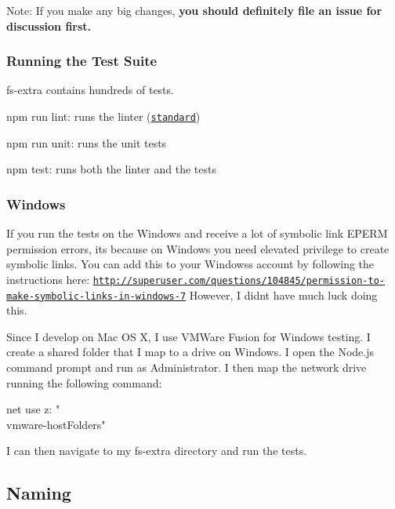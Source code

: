 Note\+: If you make any big changes, {\bfseries you should definitely file an issue for discussion first.}

\subsubsection*{Running the Test Suite}

fs-\/extra contains hundreds of tests.


\begin{DoxyItemize}
\item {\ttfamily npm run lint}\+: runs the linter (\href{http://standardjs.com/}{\tt standard})
\item {\ttfamily npm run unit}\+: runs the unit tests
\item {\ttfamily npm test}\+: runs both the linter and the tests
\end{DoxyItemize}

\subsubsection*{Windows}

If you run the tests on the Windows and receive a lot of symbolic link {\ttfamily E\+P\+E\+RM} permission errors, it\textquotesingle{}s because on Windows you need elevated privilege to create symbolic links. You can add this to your Windows\textquotesingle{}s account by following the instructions here\+: \href{http://superuser.com/questions/104845/permission-to-make-symbolic-links-in-windows-7}{\tt http\+://superuser.\+com/questions/104845/permission-\/to-\/make-\/symbolic-\/links-\/in-\/windows-\/7} However, I didn\textquotesingle{}t have much luck doing this.

Since I develop on Mac OS X, I use V\+M\+Ware Fusion for Windows testing. I create a shared folder that I map to a drive on Windows. I open the {\ttfamily Node.\+js command prompt} and run as {\ttfamily Administrator}. I then map the network drive running the following command\+: \begin{DoxyVerb}net use z: "\\vmware-host\Shared Folders"
\end{DoxyVerb}


I can then navigate to my {\ttfamily fs-\/extra} directory and run the tests.

\subsection*{Naming }

